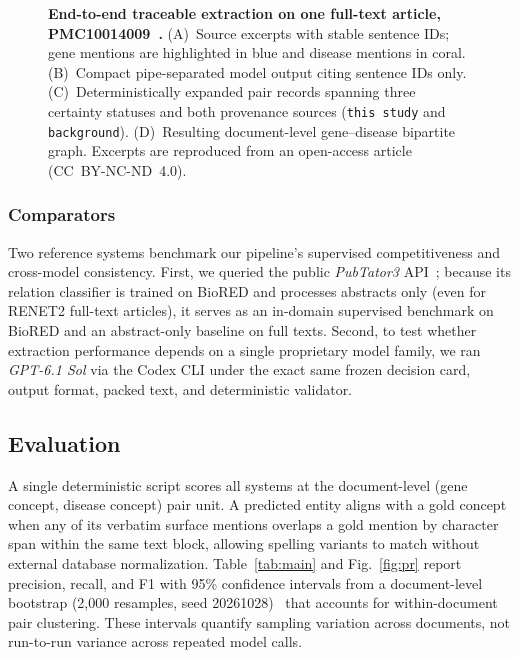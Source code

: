 \documentclass[preprint,10pt,letterpaper]{elsarticle}
\newcommand{\st}[1]{\texttt{#1}}             %
\begin{document}
\begin{figure}[!htbp]
\centering
\resizebox{\linewidth}{!}{}
\caption{\textbf{End-to-end traceable extraction on one full-text article, PMC10014009~\cite{kim2023fccm}.} (A)~Source excerpts with stable sentence IDs; gene mentions are highlighted in blue and disease mentions in coral. (B)~Compact pipe-separated model output citing sentence IDs only. (C)~Deterministically expanded pair records spanning three certainty statuses and both provenance sources (\st{this study} and \st{background}). (D)~Resulting document-level gene--disease bipartite graph. Excerpts are reproduced from an open-access article (CC~BY-NC-ND~4.0).}
\label{fig:example}
\end{figure}

\subsubsection{Comparators}
Two reference systems benchmark our pipeline's supervised competitiveness and cross-model consistency. First, we queried the public \emph{PubTator3} API~\cite{wei2024pubtator3}; because its relation classifier is trained on BioRED and processes abstracts only (even for RENET2 full-text articles), it serves as an in-domain supervised benchmark on BioRED and an abstract-only baseline on full texts. Second, to test whether extraction performance depends on a single proprietary model family, we ran \emph{GPT-6.1 Sol} via the Codex CLI under the exact same frozen decision card, output format, packed text, and deterministic validator.

\subsection{Evaluation}\label{sec:eval}
A single deterministic script scores all systems at the document-level (gene concept, disease concept) pair unit. A predicted entity aligns with a gold concept when any of its verbatim surface mentions overlaps a gold mention by character span within the same text block, allowing spelling variants to match without external database normalization. Table~\ref{tab:main} and Fig.~\ref{fig:pr} report precision, recall, and F1 with 95\% confidence intervals from a document-level bootstrap (2,000 resamples, seed 20261028)~\cite{efron1993bootstrap} that accounts for within-document pair clustering. These intervals quantify sampling variation across documents, not run-to-run variance across repeated model calls.
\end{document}

